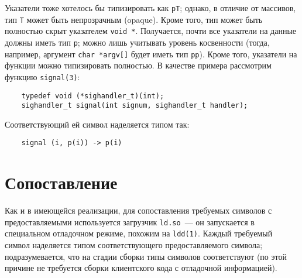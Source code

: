\documentclass[russian,a4paper,12pt]{article}
\begin{document}
Указатели тоже хотелось бы типизировать как \verb|pT|; однако, в отличие от массивов,
тип \verb|T| может быть непрозрачным (opaque).  Кроме того, тип может быть полностью
скрыт указателем \verb|void *|.  Получается, почти все указатели на данные должны
иметь тип \verb|p|; можно лишь учитывать уровень косвенности (тогда, например,
аргумент \verb|char *argv[]| будет иметь тип \verb|pp|).  Кроме того, указатели
на функции можно типизировать полностью.  В качестве примера рассмотрим
функцию \verb|signal(3)|:
\begin{verbatim}
    typedef void (*sighandler_t)(int);
    sighandler_t signal(int signum, sighandler_t handler);
\end{verbatim}
Соответствующий ей символ наделяется типом так:
\begin{verbatim}
    signal (i, p(i)) -> p(i)
\end{verbatim}
\begin{comment}
Это что же получается если бы handler возвращал значение, то было бы две стрелки,
потипа right associative?  И точно ли никакой глупости не может быть с этими стрелками?
\end{comment}

\section{Сопоставление}
Как и в имеющейся реализации, для сопоставления требуемых символов с предоставляемыми
используется загрузчик \verb|ld.so|~--- он запускается в специальном отладочном режиме,
похожим на \verb|ldd(1)|.  Каждый требуемый символ наделяется типом
соответствующего предоставляемого символа; подразумевается, что на стадии сборки
типы символов соответствуют (по этой причине не требуется сборки клиентского кода
с отладочной информацией).
\begin{comment}
Формат DWARF, кажется, вообще не предусматривает подробного описания вызова функций
(приведение фактических параметров к формальным и т.\,п.).
То есть нету там такого дела, чтобы было написано: дескать прямо перед вызовом
функции foo() я вижу ее так-то, передаю ей такие-то аргументы, для некоторых
из них выполняется cast.
\end{comment}
\end{document}
